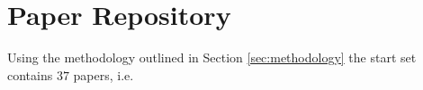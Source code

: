 \documentclass[11pt,a4paper]{book}
\theoremstyle{definition}
\theoremstyle{definition}
\theoremstyle{definition}
\theoremstyle{remark}
\begin{document}
\section{Paper Repository}

Using the methodology outlined in Section \ref{sec:methodology} the start set contains $37$ papers, i.e. 




%
%
%


%
%
%
%
\end{document}
